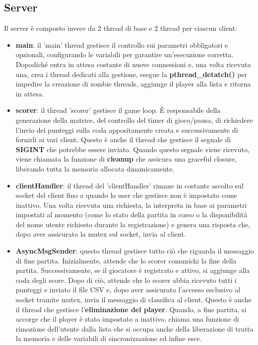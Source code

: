 \documentclass[a4paper]{article}
\begin{document}
        \subsection{Server}
        Il server è composto invece da 2 thread di base e 2 thread per ciascun client:
        \begin{itemize}
            \item \textbf{main}: il 'main' thread gestisce il controllo sui parametri obbligatori e opzionali, configurando le variabili per garantire un'esecuzione corretta. Dopodiché entra in attesa costante di nuove connessioni e, una volta ricevuta una, crea i thread dedicati alla gestione, esegue la \textbf{pthread\_detatch()} per impedire la creazione di zombie threads, aggiunge il player alla lista e ritorna in attesa.
            \item \textbf{scorer}: il thread 'scorer' gestisce il game loop. È responsabile della generazione della matrice, del controllo del timer di gioco/pausa, di richiedere l'invio dei punteggi sulla coda appositamente creata e successivamente di fornirli ai vari client. Questo è anche il thread che gestisce il segnale di \textbf{SIGINT} che potrebbe essere inviato. Quando questo segnale viene ricevuto, viene chiamata la funzione di \textbf{cleanup} che assicura una graceful closure, liberando tutta la memoria allocata dinamicamente.
            \item \textbf{clientHandler}: il thread del 'clientHandler' rimane in costante ascolto sul socket del client fino a quando lo user che gestisce non è impostato come inattivo. Una volta ricevuta una richiesta, la interpreta in base ai parametri impostati al momento (come lo stato della partita in corso o la disponibilità del nome utente richiesto durante la registrazione) e genera una risposta che, dopo aver assicurato la mutex sul socket, invia al client.
            \item \textbf{AsyncMsgSender}: questo thread gestisce tutto ciò che riguarda il messaggio di fine partita. Inizialmente, attende che lo scorer comunichi la fine della partita. Successivamente, se il giocatore è registrato e attivo, si aggiunge alla coda degli score. Dopo di ciò, attende che lo scorer abbia ricevuto tutti i punteggi e inviato il file CSV e, dopo aver assicurato l'accesso esclusivo al socket tramite mutex, invia il messaggio di classifica al client. Questo è anche il thread che gestisce l'\textbf{eliminazione del player}. Quando, a fine partita, si accorge che il player è stato impostato a inattivo, chiama una funzione di rimozione dell'utente dalla lista che si occupa anche della liberazione di trutta la memoria e delle variabili di sincronizzazione ed infine esce.
        \end{itemize}
\end{document}

